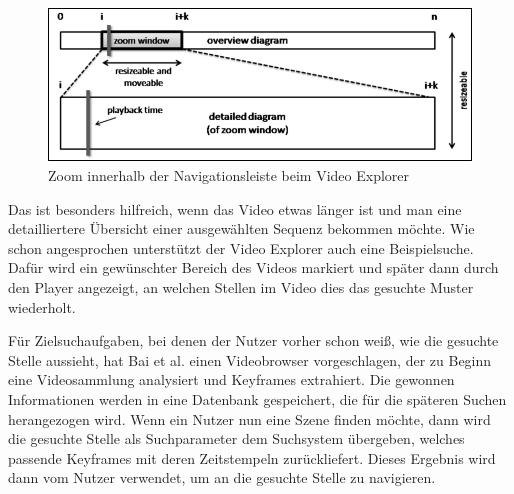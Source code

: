 \documentclass[11pt,a4paper]{report}
\begin{document}
\begin{figure}[h]
\begin{center}
\includegraphics[scale=1.05]{./images/7.png}
\caption{Zoom innerhalb der Navigationsleiste beim Video Explorer \cite{schoeffmann2010video}}
\label{zoom_video_explorer}
\end{center}
\end{figure}
Das ist besonders hilfreich, wenn das Video etwas länger ist und man eine detailliertere Übersicht einer ausgewählten Sequenz bekommen möchte. Wie schon angesprochen unterstützt der Video Explorer auch eine Beispielsuche. Dafür wird ein gewünschter Bereich des Videos markiert und später dann durch den Player angezeigt, an welchen Stellen im Video dies das gesuchte Muster wiederholt. \cite{schoeffmann2010video}

Für Zielsuchaufgaben, bei denen der Nutzer vorher schon weiß, wie die gesuchte Stelle aussieht, hat Bai et al. \cite{bai2013interactive} einen Videobrowser vorgeschlagen, der zu Beginn eine Videosammlung analysiert und Keyframes extrahiert. Die gewonnen Informationen werden in eine Datenbank gespeichert, die für die späteren Suchen herangezogen wird. Wenn ein Nutzer nun eine Szene finden möchte, dann wird die gesuchte Stelle als Suchparameter dem Suchsystem übergeben, welches passende Keyframes mit deren Zeitstempeln zurückliefert. Dieses Ergebnis wird dann vom Nutzer verwendet, um an die gesuchte Stelle zu navigieren.
\end{document}
